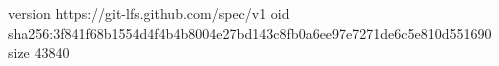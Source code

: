 version https://git-lfs.github.com/spec/v1
oid sha256:3f841f68b1554d4f4b4b8004e27bd143c8fb0a6ee97e7271de6c5e810d551690
size 43840
